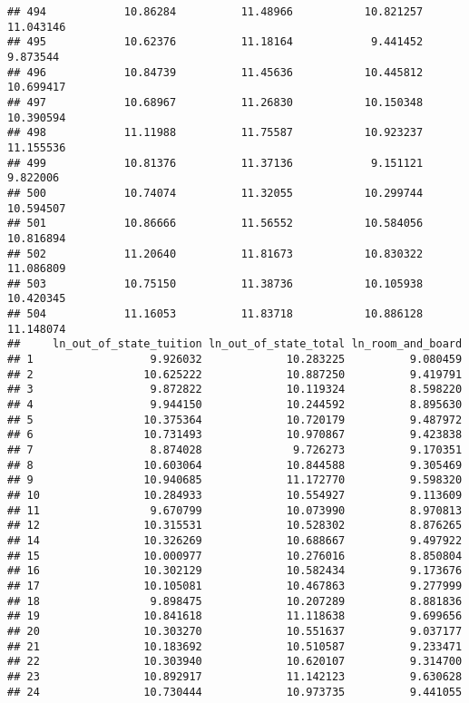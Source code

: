 \documentclass[
]{article}
\begin{document}
\begin{verbatim}
## 494            10.86284          11.48966           10.821257         11.043146
## 495            10.62376          11.18164            9.441452          9.873544
## 496            10.84739          11.45636           10.445812         10.699417
## 497            10.68967          11.26830           10.150348         10.390594
## 498            11.11988          11.75587           10.923237         11.155536
## 499            10.81376          11.37136            9.151121          9.822006
## 500            10.74074          11.32055           10.299744         10.594507
## 501            10.86666          11.56552           10.584056         10.816894
## 502            11.20640          11.81673           10.830322         11.086809
## 503            10.75150          11.38736           10.105938         10.420345
## 504            11.16053          11.83718           10.886128         11.148074
##     ln_out_of_state_tuition ln_out_of_state_total ln_room_and_board
## 1                  9.926032             10.283225          9.080459
## 2                 10.625222             10.887250          9.419791
## 3                  9.872822             10.119324          8.598220
## 4                  9.944150             10.244592          8.895630
## 5                 10.375364             10.720179          9.487972
## 6                 10.731493             10.970867          9.423838
## 7                  8.874028              9.726273          9.170351
## 8                 10.603064             10.844588          9.305469
## 9                 10.940685             11.172770          9.598320
## 10                10.284933             10.554927          9.113609
## 11                 9.670799             10.073990          8.970813
## 12                10.315531             10.528302          8.876265
## 14                10.326269             10.688667          9.497922
## 15                10.000977             10.276016          8.850804
## 16                10.302129             10.582434          9.173676
## 17                10.105081             10.467863          9.277999
## 18                 9.898475             10.207289          8.881836
## 19                10.841618             11.118638          9.699656
## 20                10.303270             10.551637          9.037177
## 21                10.183692             10.510587          9.233471
## 22                10.303940             10.620107          9.314700
## 23                10.892917             11.142123          9.630628
## 24                10.730444             10.973735          9.441055

\end{verbatim}
\end{document}
